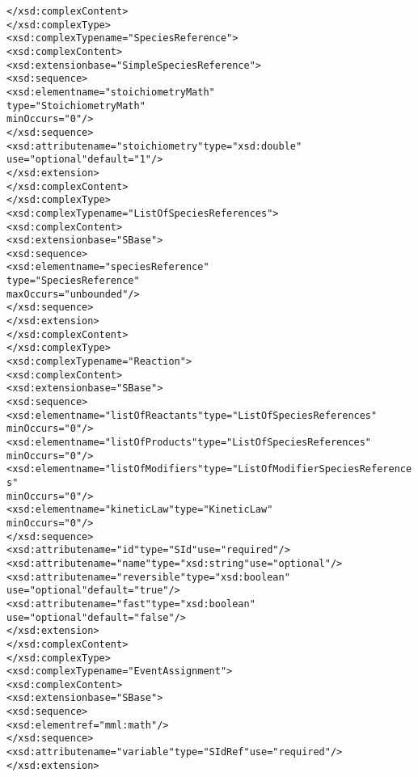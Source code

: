 \begin{alltt}
        </xsd:complexContent>
    </xsd:complexType>
    <xsd:complexType name="SpeciesReference">
        <xsd:complexContent>
            <xsd:extension base="SimpleSpeciesReference">
                <xsd:sequence>
                    <xsd:element name="stoichiometryMath" 
                                 type="StoichiometryMath" 
                                 minOccurs="0"/>
                </xsd:sequence>
                <xsd:attribute name="stoichiometry" type="xsd:double" 
                               use="optional" default="1"/>
            </xsd:extension>
        </xsd:complexContent>
    </xsd:complexType>
    <xsd:complexType name="ListOfSpeciesReferences">
        <xsd:complexContent>
            <xsd:extension base="SBase">
                <xsd:sequence>
                    <xsd:element name="speciesReference" 
                                 type="SpeciesReference" 
                                 maxOccurs="unbounded"/>
                </xsd:sequence>
            </xsd:extension>
        </xsd:complexContent>
    </xsd:complexType>
    <xsd:complexType name="Reaction">
        <xsd:complexContent>
            <xsd:extension base="SBase">
                <xsd:sequence>
                    <xsd:element name="listOfReactants" type="ListOfSpeciesReferences" 
                                 minOccurs="0"/>
                    <xsd:element name="listOfProducts" type="ListOfSpeciesReferences" 
                                 minOccurs="0"/>
                    <xsd:element name="listOfModifiers" type="ListOfModifierSpeciesReferences" 
                                 minOccurs="0"/>
                    <xsd:element name="kineticLaw" type="KineticLaw" 
                                 minOccurs="0"/>
                </xsd:sequence>
                <xsd:attribute name="id" type="SId" use="required"/>
                <xsd:attribute name="name" type="xsd:string" use="optional"/>
                <xsd:attribute name="reversible" type="xsd:boolean" 
                               use="optional" default="true"/>
                <xsd:attribute name="fast" type="xsd:boolean" 
                               use="optional" default="false"/>
            </xsd:extension>
        </xsd:complexContent>
    </xsd:complexType>
    <xsd:complexType name="EventAssignment">
        <xsd:complexContent>
            <xsd:extension base="SBase">
                <xsd:sequence>
                    <xsd:element ref="mml:math"/>
                </xsd:sequence>
                <xsd:attribute name="variable" type="SIdRef" use="required"/>
            </xsd:extension>

\end{alltt}
